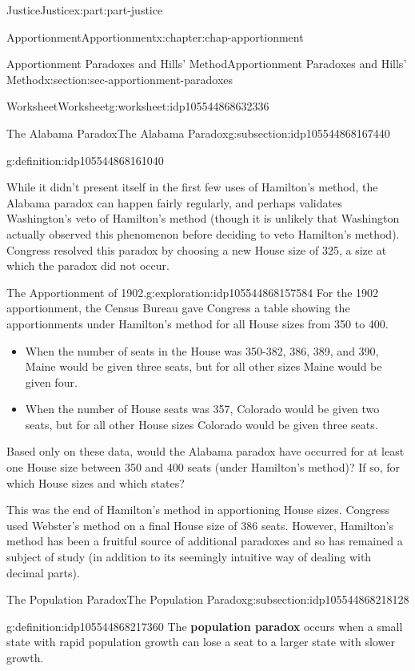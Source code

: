 \documentclass[oneside,10pt,]{book}
\newcommand{\terminology}[1]{\textbf{#1}}
\numberwithin{equation}{section}
\begin{document}
\begin{partptx}{Justice}{}{Justice}{}{}{x:part:part-justice}
\begin{chapterptx}{Apportionment}{}{Apportionment}{}{}{x:chapter:chap-apportionment}
\begin{sectionptx}{Apportionment Paradoxes and Hills' Method}{}{Apportionment Paradoxes and Hills' Method}{}{}{x:section:sec-apportionment-paradoxes}
\begin{worksheet-subsection}{Worksheet}{}{Worksheet}{}{}{g:worksheet:idp105544868632336}
\begin{subsectionptx}{The Alabama Paradox}{}{The Alabama Paradox}{}{}{g:subsection:idp105544868167440}
\begin{definition}{}{g:definition:idp105544868161040}
\end{definition}
While it didn't present itself in the first few uses of Hamilton's method, the Alabama paradox can happen fairly regularly, and perhaps validates Washington's veto of Hamilton's method (though it is unlikely that Washington actually observed this phenomenon before deciding to veto Hamilton's method). Congress resolved this paradox by choosing a new House size of 325, a size at which the paradox did not occur.%

\newpage
\begin{exploration}{The Apportionment of 1902.}{g:exploration:idp105544868157584}%
For the 1902 apportionment, the Census Bureau gave Congress a table showing the apportionments under Hamilton's method for all House sizes from 350 to 400.%
%
\begin{itemize}[label=\textbullet]
\item{}When the number of seats in the House was 350-382, 386, 389, and 390, Maine would be given three seats, but for all other sizes Maine would be given four.%
\item{}When the number of House seats was 357, Colorado would be given two seats, but for all other House sizes Colorado would be given three seats.%
\end{itemize}
Based only on these data, would the Alabama paradox have occurred for at least one House size between 350 and 400 seats (under Hamilton's method)? If so, for which House sizes and which states?%
\vspace{1.5in}
\end{exploration}%
This was the end of Hamilton's method in apportioning House sizes. Congress used Webster's method on a final House size of 386 seats. However, Hamilton's method has been a fruitful source of additional paradoxes and so has remained a subject of study (in addition to its seemingly intuitive way of dealing with decimal parts).%
\end{subsectionptx}
%
%
\typeout{************************************************}
\typeout{************************************************}
%
\begin{subsectionptx}{The Population Paradox}{}{The Population Paradox}{}{}{g:subsection:idp105544868218128}
\begin{definition}{}{g:definition:idp105544868217360}%
The \terminology{population paradox} occurs when a small state with rapid population growth can lose a seat to a larger state with slower growth.%
\end{definition}

\end{subsectionptx}
\end{worksheet-subsection}
\end{sectionptx}
\end{chapterptx}
\end{partptx}
\end{document}
